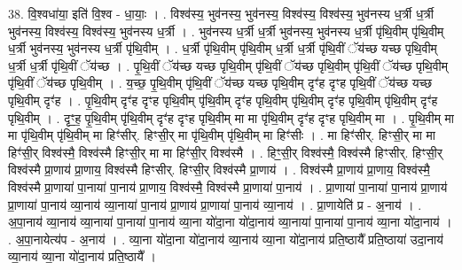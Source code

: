 \documentclass[17pt]{extarticle}
\begin{document}
38. वि॒श्वधा॑या॒ इति॑ वि॒श्व - धा॒याः॒ । . विश्व॑स्य॒ भुव॑नस्य॒ भुव॑नस्य॒ विश्व॑स्य॒ विश्व॑स्य॒ भुव॑नस्य ध॒र्त्री ध॒र्त्री भुव॑नस्य॒ विश्व॑स्य॒ विश्व॑स्य॒ भुव॑नस्य ध॒र्त्री । . भुव॑नस्य ध॒र्त्री ध॒र्त्री भुव॑नस्य॒ भुव॑नस्य ध॒र्त्री पृ॑थि॒वीम् पृ॑थि॒वीम् ध॒र्त्री भुव॑नस्य॒ भुव॑नस्य ध॒र्त्री पृ॑थि॒वीम् । . ध॒र्त्री पृ॑थि॒वीम् पृ॑थि॒वीम् ध॒र्त्री ध॒र्त्री पृ॑थि॒वीं ॅय॑च्छ यच्छ पृथि॒वीम् ध॒र्त्री ध॒र्त्री पृ॑थि॒वीं ॅय॑च्छ । . पृ॒थि॒वीं ॅय॑च्छ यच्छ पृथि॒वीम् पृ॑थि॒वीं ॅय॑च्छ पृथि॒वीम् पृ॑थि॒वीं ॅय॑च्छ पृथि॒वीम् पृ॑थि॒वीं ॅय॑च्छ पृथि॒वीम् । . य॒च्छ॒ पृ॒थि॒वीम् पृ॑थि॒वीं ॅय॑च्छ यच्छ पृथि॒वीम् दृꣳ॑ह दृꣳह पृथि॒वीं ॅय॑च्छ यच्छ पृथि॒वीम् दृꣳ॑ह । . पृ॒थि॒वीम् दृꣳ॑ह दृꣳह पृथि॒वीम् पृ॑थि॒वीम् दृꣳ॑ह पृथि॒वीम् पृ॑थि॒वीम् दृꣳ॑ह पृथि॒वीम् पृ॑थि॒वीम् दृꣳ॑ह पृथि॒वीम् । . दृꣳ॒॒ह॒ पृ॒थि॒वीम् पृ॑थि॒वीम् दृꣳ॑ह दृꣳह पृथि॒वीम् मा मा पृ॑थि॒वीम् दृꣳ॑ह दृꣳह पृथि॒वीम् मा । . पृ॒थि॒वीम् मा मा पृ॑थि॒वीम् पृ॑थि॒वीम् मा हिꣳ॑सीर्. हिꣳसी॒र् मा पृ॑थि॒वीम् पृ॑थि॒वीम् मा हिꣳ॑सीः । . मा हिꣳ॑सीर्. हिꣳसी॒र् मा मा हिꣳ॑सी॒र् विश्व॑स्मै॒ विश्व॑स्मै हिꣳसी॒र् मा मा हिꣳ॑सी॒र् विश्व॑स्मै । . हिꣳ॒॒सी॒र् विश्व॑स्मै॒ विश्व॑स्मै हिꣳसीर्. हिꣳसी॒र् विश्व॑स्मै प्रा॒णाय॑ प्रा॒णाय॒ विश्व॑स्मै हिꣳसीर्. हिꣳसी॒र् विश्व॑स्मै प्रा॒णाय॑ । . विश्व॑स्मै प्रा॒णाय॑ प्रा॒णाय॒ विश्व॑स्मै॒ विश्व॑स्मै प्रा॒णाया॑ पा॒नाया॑ पा॒नाय॑ प्रा॒णाय॒ विश्व॑स्मै॒ विश्व॑स्मै प्रा॒णाया॑ पा॒नाय॑ । . प्रा॒णाया॑ पा॒नाया॑ पा॒नाय॑ प्रा॒णाय॑ प्रा॒णाया॑ पा॒नाय॑ व्या॒नाय॑ व्या॒नाया॑ पा॒नाय॑ प्रा॒णाय॑ प्रा॒णाया॑ पा॒नाय॑ व्या॒नाय॑ । . प्रा॒णायेति॑ प्र - अ॒नाय॑ । . अ॒पा॒नाय॑ व्या॒नाय॑ व्या॒नाया॑ पा॒नाया॑ पा॒नाय॑ व्या॒ना यो॑दा॒ना यो॑दा॒नाय॑ व्या॒नाया॑ पा॒नाया॑ पा॒नाय॑ व्या॒ना यो॑दा॒नाय॑ । . अ॒पा॒नायेत्य॑प - अ॒नाय॑ । . व्या॒ना यो॑दा॒ना यो॑दा॒नाय॑ व्या॒नाय॑ व्या॒ना यो॑दा॒नाय॑ प्रति॒ष्ठायै᳚ प्रति॒ष्ठाया॑ उदा॒नाय॑ व्या॒नाय॑ व्या॒ना यो॑दा॒नाय॑ प्रति॒ष्ठायै᳚ । \newline
\end{document}
